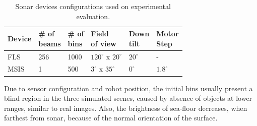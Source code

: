 \documentclass[final,5p,times]{elsarticle}
\begin{document}
\begin{table}[t]
    \caption{Sonar devices configurations used on experimental evaluation.}
    \label{table:sonar_settings}
    \begin{center}
        \begin{tabular}{| m{.4in} | m{.35in} | m{.35in} | m{.6in} | m{.3in} | m{.35in} |}
            \hline
            Device & \shortstack{\# of\\ beams} & \shortstack{\# of\\ bins} & \shortstack{Field \\of view} & \shortstack{Down\\tilt} & \shortstack{Motor\\Step}\\
            \hline
            FLS  & 256 & 1000 & $120^{\circ}$ x $20^{\circ}$ & $20^{\circ}$  & - \\ \hline
            MSIS & 1   & 500  & $3^{\circ}$ x $35^{\circ}$	 & $0^{\circ}$  & $1.8^{\circ}$ \\ \hline
        \end{tabular}
    \end{center}
\end{table}


Due to sensor configuration and robot position, the initial bins usually present a blind region in the three simulated scenes, caused by absence of objects at lower ranges, similar to real images. Also, the brightness of sea-floor decreases, when farthest from sonar, because of the normal orientation of the surface.
\end{document}
